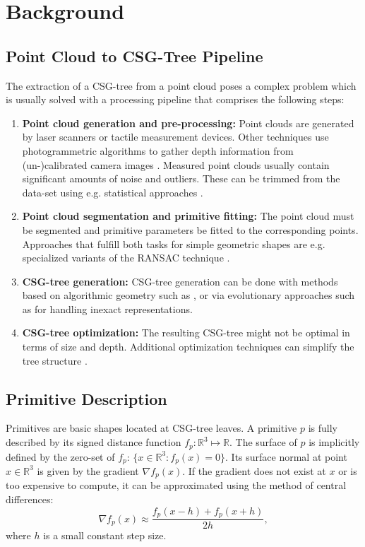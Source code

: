 \section{Background}
\label{sec:back}
\subsection{Point Cloud to \ac{CSG}-Tree Pipeline} 
The extraction of a \ac{CSG}-tree from a point cloud poses a complex problem which is usually solved with a processing pipeline that comprises the following steps:  
\begin{enumerate}
\item \textbf{Point cloud generation and pre-processing:} Point clouds are generated by laser scanners or tactile measurement devices. 
Other techniques use photogrammetric algorithms to gather depth information from (un-)calibrated camera images \cite{hartley2003multiple}.
Measured point clouds usually contain significant amounts of noise and outliers. 
These can be trimmed from the data-set using e.g. statistical approaches  \cite{rusu20113d}.
\item \textbf{Point cloud segmentation and primitive fitting:} The point cloud must be segmented and primitive parameters be fitted to the corresponding points. Approaches that fulfill both tasks for simple geometric shapes are e.g. specialized variants of the \ac{RANSAC} technique \cite{schnabel2007efficient}.
\item \textbf{\ac{CSG}-tree generation:} \ac{CSG}-tree generation can be done with methods based on algorithmic geometry such as \cite{shapiro1993separation, buchele2004three}, or via evolutionary approaches such as \cite{fayolle2016evolutionary} for handling inexact representations.
\item \textbf {\ac{CSG}-tree optimization:} The resulting \ac{CSG}-tree might not be optimal in terms of size and depth.
Additional optimization techniques can simplify the tree structure \cite{weiss2009geometry, shapiro1991construction}. 
\end{enumerate}
\subsection{Primitive Description}
Primitives are basic shapes located at \ac{CSG}-tree leaves. 
A primitive $p$ is fully described by its signed distance function $f_p: \mathbb{R}^3 \mapsto \mathbb{R}$.
The surface of $p$ is implicitly defined by the zero-set of $f_p$: $\{x \in \mathbb{R}^3 : f_p(x)=0\}$.
Its surface normal at point $x \in \mathbb{R}^3$ is given by the gradient $\nabla f_p(x)$.
If the gradient does not exist at $x$ or is too expensive to compute, it can be approximated using the method of central differences:
\begin{equation}
\nabla f_p(x) \approx \frac{f_p(x - h) + f_p(x + h)}{2h},
\end{equation}
where $h$ is a small constant step size.
